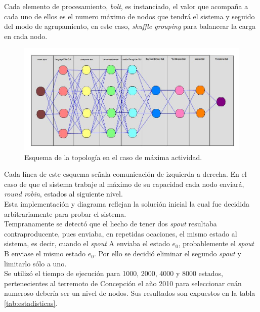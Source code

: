 Cada elemento de procesamiento, \textit{bolt}, es instanciado, el valor que acompaña a cada uno de ellos es el numero máximo de nodos que tendrá el sistema y seguido del modo de agrupamiento, en este caso, \textit{shuffle grouping} para balancear la carga en cada nodo.

\begin{figure}[H]
	\centering
	\captionsetup{justification=centering}
	\includegraphics[scale=0.5]{images/ImplementacionTopologia1.2.png}
	\caption[Esquema de la topología en el caso de máxima actividad.]{Esquema de la topología en el caso de máxima actividad.}
	\label{fig:Implementacion1p2}
\end{figure}

Cada línea de este esquema señala comunicación de izquierda a derecha. En el caso de que el sistema trabaje al máximo de su capacidad cada nodo enviará, \textit{round robin}, estados al siguiente nivel.\\

Esta implementación y diagrama reflejan la solución inicial la cual fue decidida arbitrariamente para probar el sistema.\\

Tempranamente se detectó que el hecho de tener dos \textit{spout} resultaba contraproducente, pues enviaba, en repetidas ocaciones, el mismo estado al sistema, es decir, cuando el \textit{spout} A enviaba el estado $e_{0}$, probablemente el \textit{spout} B enviase el mismo estado $e_{0}$. Por ello se decidió eliminar el segundo \textit{spout} y limitarlo sólo a uno.\\

Se utilizó el tiempo de ejecución para 1000, 2000, 4000 y 8000 estados, pertenecientes al terremoto de Concepción el año 2010 para seleccionar cuán numeroso debería ser un nivel de nodos. Sus resultados son expuestos en la tabla \ref{tab:estadisticas}.

